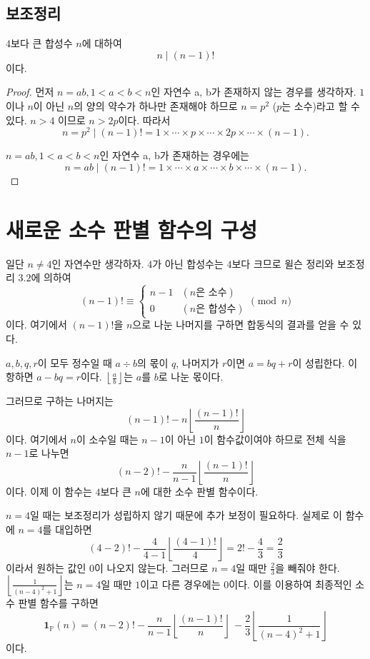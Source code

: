 \documentclass{article}
\begin{document}
\subsection{보조정리}
\(4\)보다 큰 합성수 \(n\)에 대하여
\[n \mid (n-1)!\]
이다.

\begin{proof}
먼저 \(n = ab, 1<a<b<n\)인 자연수 a, b가 존재하지 않는 경우를 생각하자. \(1\)이나 \(n\)이 아닌 \(n\)의 양의 약수가 하나만 존재해야 하므로 \(n=p^2\) (\(p\)는 소수)라고 할 수 있다. \(n>4\) 이므로 \(n > 2p\)이다.
따라서 \[n = p^2 \mid (n-1)! = 1 \times \cdots \times p \times \cdots \times 2p \times \cdots \times (n-1).\]

\(n = ab, 1<a<b<n\)인 자연수 a, b가 존재하는 경우에는
\[n = ab\mid (n-1)! = 1 \times \cdots \times a \times \cdots \times b \times \cdots \times (n-1).\]
\end{proof}

\section{새로운 소수 판별 함수의 구성}
일단 \(n \ne 4\)인 자연수만 생각하자. \(4\)가 아닌 합성수는 \(4\)보다 크므로 윌슨 정리와 보조정리 \(3.2\)에 의하여 
\[(n-1)! \equiv \begin{cases}
    n-1 & (n\text{은 소수})\\
    0 & (n\text{은 합성수})
\end{cases} \pmod n\]
이다. 여기에서 \((n-1)!\)을 \(n\)으로 나눈 나머지를 구하면 합동식의 결과를 얻을 수 있다. 

\(a, b, q, r\)이 모두 정수일 때 \(a \div b\)의 몫이 \(q\), 나머지가 \(r\)이면 \(a=bq+r\)이 성립한다. 
이항하면 \(a-bq=r\)이다. \(\left\lfloor \frac{a}{b} \right\rfloor\)는 \(a\)를 \(b\)로 나눈 몫이다. 

그러므로 구하는 나머지는
\[(n-1)! - n\left\lfloor \frac{(n-1)!}{n} \right\rfloor\]
이다. 여기에서 \(n\)이 소수일 때는 \(n-1\)이 아닌 \(1\)이 함수값이여야 하므로 전체 식을 \(n-1\)로 나누면 
\[(n-2)!-\frac{n}{n-1} \left\lfloor \frac{(n-1)!}{n} \right\rfloor\]
이다. 이제 이 함수는 \(4\)보다 큰 \(n\)에 대한 소수 판별 함수이다. 

\(n=4\)일 때는 보조정리가 성립하지 않기 때문에 추가 보정이 필요하다. 실제로 이 함수에 \(n=4\)를 대입하면
\[(4-2)!-\frac{4}{4-1} \left\lfloor \frac{(4-1)!}{4} \right\rfloor=2!-\frac{4}{3}=\frac{2}{3}\]
이라서 원하는 값인 \(0\)이 나오지 않는다. 그러므로 \(n=4\)일 때만 \(\frac{2}{3}\)을 빼줘야 한다. 
\(\left\lfloor \frac{1}{(n-4)^2+1} \right\rfloor\)는 \(n=4\)일 때만 \(1\)이고 다른 경우에는 \(0\)이다. 
이를 이용하여 최종적인 소수 판별 함수를 구하면
\[\mathbf{1}_\mathbb{P} (n)= (n-2)!-\frac{n}{n-1} \left\lfloor \frac{(n-1)!}{n} \right\rfloor\ - \frac{2}{3}\left\lfloor \frac{1}{(n-4)^2+1} \right\rfloor\]
이다.
\end{document}
